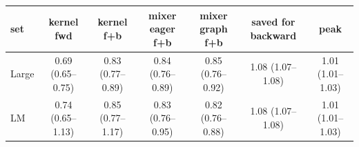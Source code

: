 \begin{tabular}{l c c c c c c }
\toprule
set & kernel fwd & kernel f+b & mixer eager f+b & mixer graph f+b & saved for backward & peak \\
\midrule
Large & 0.69 (0.65--0.75) & 0.83 (0.77--0.89) & 0.84 (0.76--0.89) & 0.85 (0.76--0.92) & 1.08 (1.07--1.08) & 1.01 (1.01--1.03) \\
LM & 0.74 (0.65--1.13) & 0.85 (0.77--1.17) & 0.83 (0.76--0.95) & 0.82 (0.76--0.88) & 1.08 (1.07--1.08) & 1.01 (1.01--1.03) \\
\bottomrule
\end{tabular}
